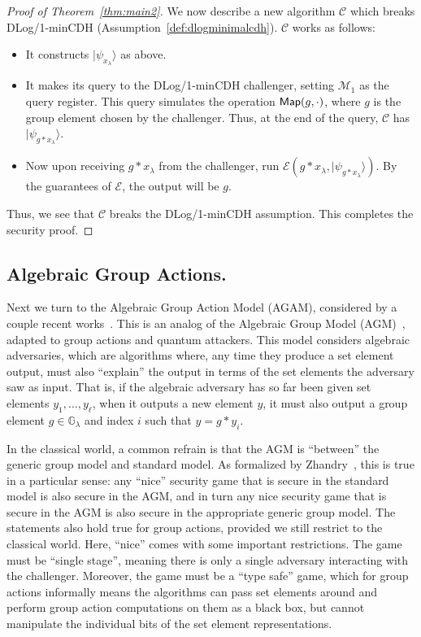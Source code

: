 \documentclass{article}\usepackage[a4paper,margin=20mm]{geometry}
\numberwithin{theorem}{section}
\numberwithin{equation}{section}
\newcommand{\G}{\mathbb{G}}
\newcommand{\Cs}{{\mathcal{C}}}
\newcommand{\Es}{{\mathcal{E}}}
\newcommand{\Ms}{{\mathcal{M}}}
\begin{document}
\begin{proof}[Proof of Theorem~\ref{thm:main2}]
	We now describe a new algorithm $\Cs$ which breaks DLog/1-minCDH (Assumption~\ref{def:dlogminimalcdh}). $\Cs$ works as follows:
	\begin{itemize}
		\item It constructs $|\psi_{x_\lambda}\rangle$ as above.
		\item It makes its query to the DLog/1-minCDH challenger, setting $\Ms_1$ as the query register. This query simulates the operation ${\sf Map}(g,\cdot)$, where $g$ is the group element chosen by the challenger. Thus, at the end of the query, $\Cs$ has $|\psi_{g*x_\lambda}\rangle$.
		\item Now upon receiving $g*x_\lambda$ from the challenger, run $\Es(g*x_\lambda,|\psi_{g*x_\lambda}\rangle)$. By the guarantees of $\Es$, the output will be $g$.
	\end{itemize}
	Thus, we see that $\Cs$ breaks the DLog/1-minCDH assumption. This completes the security proof.\end{proof}













\subsection{Algebraic Group Actions.}

Next we turn to the Algebraic Group Action Model (AGAM), considered by a couple recent works~\cite{PKC:DHKKLR23,EPRINT:OrsZan23}. This is an analog of the Algebraic Group Model (AGM)~\cite{C:FucKilLos18}, adapted to group actions and quantum attackers. This model considers algebraic adversaries, which are algorithms where, any time they produce a set element output, must also ``explain'' the output in terms of the set elements the adversary saw as input. That is, if the algebraic adversary has so far been given set elements $y_1,\dots,y_\ell$, when it outputs a new element $y$, it must also output a group element $g\in \G_\lambda$ and index $i$ such that $y=g*y_i$.

In the classical world, a common refrain is that the AGM is ``between'' the generic group model and standard model. As formalized by Zhandry~\cite{C:Zhandry22b}, this is true in a particular sense: any ``nice'' security game that is secure in the standard model is also secure in the AGM, and in turn any nice security game that is secure in the AGM is also secure in the appropriate generic group model. The statements also hold true for group actions, provided we still restrict to the classical world. Here, ``nice'' comes with some important restrictions. The game must be ``single stage'', meaning there is only a single adversary interacting with the challenger. Moreover, the game must be a ``type safe'' game, which for group actions informally means the algorithms can pass set elements around and perform group action computations on them as a black box, but cannot manipulate the individual bits of the set element representations.
\end{document}
